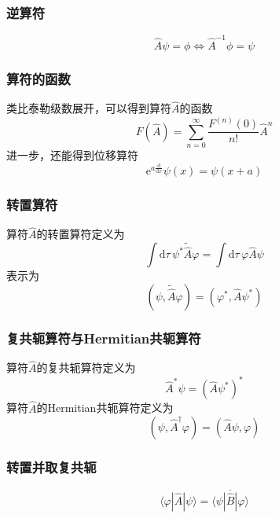 \subsubsection{逆算符}
$$
    \hat{A}\psi=\phi \iff \hat{A}^{-1}\phi=\psi
$$

\subsubsection{算符的函数}
类比泰勒级数展开，可以得到算符$\hat{A}$的函数
\begin{equation}
    F\left(\hat{A}\right)=\sum_{n=0}^{\infty}\frac{F^{(n)}(0)}{n!}\hat{A}^n
\end{equation}
进一步，还能得到位移算符
$$
    \mathrm{e}^{a\frac{\mathrm{d}}{\mathrm{d}x}}\psi(x) = \psi(x+a)
$$

\subsubsection{转置算符}
算符$\hat{A}$的转置算符定义为
$$
    \int\mathrm{d}\tau \,\psi^*\tilde{\hat{A}}\varphi = \int\mathrm{d}\tau \,\varphi\hat{A}\psi
$$
表示为
\begin{equation}
    \left(\psi, \tilde{\hat{A}}\varphi\right) = \left(\varphi^*, \hat{A}\psi^*\right)
\end{equation}



\subsubsection{复共轭算符与Hermitian共轭算符}
算符$\hat{A}$的复共轭算符定义为
\begin{equation}
    \hat{A}^*\psi = \left(\hat{A}\psi^*\right)^*
\end{equation}
算符$\hat{A}$的Hermitian共轭算符定义为
\begin{equation}
    \left(\psi, \hat{A}^{\dagger}\varphi\right) = \left(\hat{A}\psi, \varphi\right)
\end{equation}

\subsubsection{转置并取复共轭}
$$
    \langle\varphi|\hat{A}|\psi\rangle=\overline{\langle\psi|\hat{B}|\varphi\rangle}
$$

